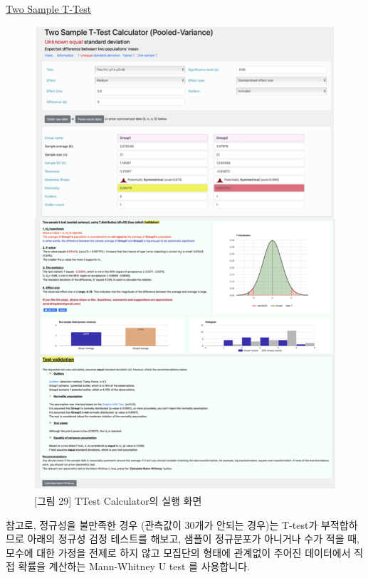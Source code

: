 \documentclass[
  letterpaper,
]{book}
\begin{document}
\href{https://www.statskingdom.com/140MeanT2eq.html}{Two Sample T-Test}

\begin{figure}[H]

{\centering \includegraphics{img/fig29.png}

}

\caption{{[}그림 29{]} TTest Calculator의 실행 화면}

\end{figure}%

참고로, 정규성을 불만족한 경우 (관측값이 30개가 안되는 경우)는 T-test가
부적합하므로 아래의 정규성 검정 테스트를 해보고, 샘플이 정규분포가
아니거나 수가 적을 때, 모수에 대한 가정을 전제로 하지 않고 모집단의
형태에 관계없이 주어진 데이터에서 직접 확률을 계산하는 Mann-Whitney U
test 를 사용합니다.
\end{document}

